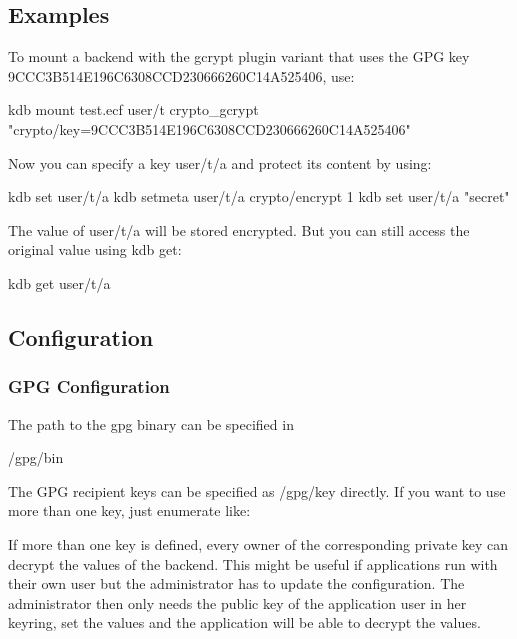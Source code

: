 \subsection*{Examples}

To mount a backend with the gcrypt plugin variant that uses the G\+P\+G key 9\+C\+C\+C3\+B514\+E196\+C6308\+C\+C\+D230666260\+C14\+A525406, use\+: \begin{DoxyVerb}kdb mount test.ecf user/t crypto_gcrypt "crypto/key=9CCC3B514E196C6308CCD230666260C14A525406"
\end{DoxyVerb}


Now you can specify a key {\ttfamily user/t/a} and protect its content by using\+: \begin{DoxyVerb}kdb set user/t/a
kdb setmeta user/t/a crypto/encrypt 1
kdb set user/t/a "secret"
\end{DoxyVerb}


The value of {\ttfamily user/t/a} will be stored encrypted. But you can still access the original value using {\ttfamily kdb get}\+: \begin{DoxyVerb}kdb get user/t/a
\end{DoxyVerb}


\subsection*{Configuration}

\subsubsection*{G\+P\+G Configuration}

The path to the gpg binary can be specified in \begin{DoxyVerb}/gpg/bin
\end{DoxyVerb}


The G\+P\+G recipient keys can be specified as {\ttfamily /gpg/key} directly. If you want to use more than one key, just enumerate like\+: 


If more than one key is defined, every owner of the corresponding private key can decrypt the values of the backend. This might be useful if applications run with their own user but the administrator has to update the configuration. The administrator then only needs the public key of the application user in her keyring, set the values and the application will be able to decrypt the values.

